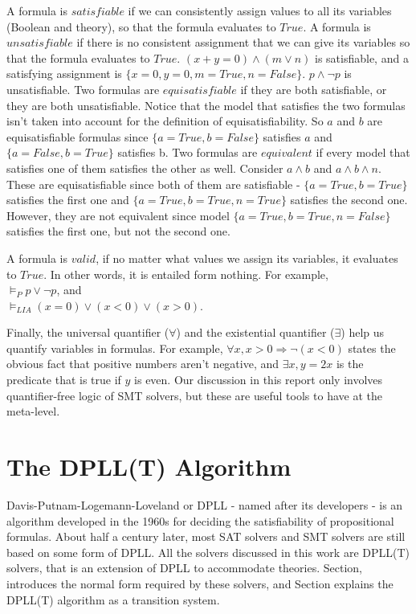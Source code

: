 \documentclass{report}
\begin{document}
A formula is $satisfiable$ if we can consistently assign
values to all its variables (Boolean and theory), 
so that the formula evaluates to $True$. A formula is 
$unsatisfiable$ if there is no consistent assignment that 
we can give its variables so that the formula evaluates to 
$True$. $(x + y = 0) \land (m \lor n)$ is satisfiable, 
and a satisfying assignment is $\{x = 0, y = 0, m = True, 
n = False\}$. $p \land \neg p$ is unsatisfiable. Two formulas 
are $equisatisfiable$ if they are both satisfiable, or they 
are both unsatisfiable. Notice that the model that 
satisfies the two formulas isn't taken into account 
for the definition of equisatisfiability. So $a$ and $b$ are 
equisatisfiable formulas since $\{a = True, b = False\}$ 
satisfies $a$ and $\{a = False, b = True\}$ satisfies b. 
Two formulas are $equivalent$ if every model that satisfies 
one of them satisfies the other as well. Consider 
$a \land b$ and $a \land b \land n$. These are 
equisatisfiable since both of them are satisfiable - 
$\{a = True, b = True\}$ satisfies the first one and 
$\{a = True, b = True, n = True\}$ satisfies the second one.
However, they are not equivalent since model 
$\{a = True, b = True, n = False\}$ satisfies the first one, 
but not the second one.

A formula is $valid$, if no matter what values we assign its 
variables, it evaluates to $True$. In other words, it is
entailed form nothing. For example, \\
$\models_P p \lor \neg p$, and \\
$\models_{LIA} (x = 0) \lor (x < 0) \lor (x > 0)$.

Finally, the universal quantifier ($\forall$) and 
the existential quantifier ($\exists$) help us quantify 
variables in formulas. For example, $\forall x, x > 0 
\Rightarrow \neg (x < 0)$ states the obvious fact that 
positive numbers aren't negative, and $\exists x, y = 2x$ 
is the predicate that is true if $y$ is even. Our discussion 
in this report only involves quantifier-free logic of SMT 
solvers, but these are useful tools to have at the meta-level.


\section{The DPLL(T) Algorithm}
\label{sec:dpll}
Davis-Putnam-Logemann-Loveland or DPLL - named after its 
developers - is an algorithm developed in the 1960s 
for deciding the satisfiability of propositional formulas.
About half a century later, most SAT solvers and SMT solvers
are still based on some form of DPLL. All the solvers 
discussed in this work are DPLL(T) solvers, that is an 
extension of DPLL to accommodate theories. Section,
introduces the normal form required by these solvers, 
and Section explains the DPLL(T) algorithm as a 
transition system.
\end{document}
